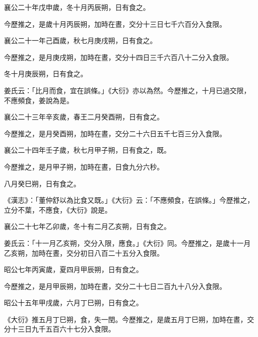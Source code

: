 \begin{pinyinscope}
 襄公二十年戊申歲，冬十月丙辰朔，日有食之。



 今歷推之，是歲十月丙辰朔，加時在晝，交分十三日七千六百分入食限。



 襄公二十一年己酉歲，秋七月庚戌朔，日有食之。



 今歷推之，是月庚戌朔，加時在晝，交分十四日三千六百八十二分入食限。



 冬十月庚辰朔，日有食之。



 姜氏云：「比月而食，宜在誤條。」《大衍》亦以為然。今歷推之，十月已過交限，不應頻食，姜說為是。



 襄公二十三年辛亥歲，春王二月癸酉朔，日有食之。



 今歷推之，是月癸酉朔，加時在晝，交分二十六日五千七百三分入食限。



 襄公二十四年壬子歲，秋七月甲子朔，日有食之，既。



 今歷推之，是月甲子朔，加時在晝，日食九分六秒。



 八月癸巳朔，日有食之。



 《漢志》：「董仲舒以為比食又既。」《大衍》云：「不應頻食，在誤條。」今歷推之，立分不葉，不應食，《大衍》說是。



 襄公二十七年乙卯歲，冬十有二月乙亥朔，日有食之。



 姜氏云：「十一月乙亥朔，交分入限，應食。」《大衍》同。今歷推之，是歲十一月乙亥朔，加時在晝，交分初日八百二十五分入食限。



 昭公七年丙寅歲，夏四月甲辰朔，日有食之。



 今歷推之，是月甲辰朔，加時在晝，交分二十七日二百九十八分入食限。



 昭公十五年甲戌歲，六月丁巳朔，日有食之。



 《大衍》推五月丁巳朔，食，失一閏。今歷推之，是歲五月丁巳朔，加時在晝，交分十三日九千五百六十七分入食限。




\end{pinyinscope}
